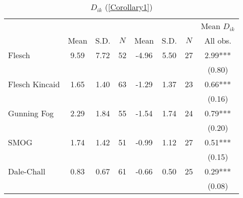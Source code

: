 \begin{table}
    \footnotesize
    \centering
    \begin{threeparttable}
        \caption{\(D_{ik}\) (\autoref{Corollary1})}
        \label{table8_base}
        \begin{tabular}{p{3cm}S[table-format=3.3]@{}S[table-format=3.3]@{}S[table-format=3.2]@{}S[table-format=4.3]@{}S[table-format=3.3]@{}S[table-format=3.1]@{}S@{}}
            \toprule
            &&&{{Mean \(D_{ik}\)}}\\\cmidrule(lr){2-4}\cmidrule(lr){5-7}\cmidrule(lr){8-8}&{{Mean}}&{{S.D.}}&{{\(N\)}}&{{Mean}}&{{S.D.}}&{{\(N\)}}&{{All obs.}}\\
            \midrule
            Flesch                        &        9.59&        7.72&          52&       -4.96&        5.50&          27&        2.99***\\
                                          &            &            &            &            &            &            &      (0.80)   \\
            Flesch Kincaid                &        1.65&        1.40&          63&       -1.29&        1.37&          23&        0.66***\\
                                          &            &            &            &            &            &            &      (0.16)   \\
            Gunning Fog                   &        2.29&        1.84&          55&       -1.54&        1.74&          24&        0.79***\\
                                          &            &            &            &            &            &            &      (0.20)   \\
            SMOG                          &        1.74&        1.42&          51&       -0.99&        1.12&          27&        0.51***\\
                                          &            &            &            &            &            &            &      (0.15)   \\
            Dale-Chall                    &        0.83&        0.67&          61&       -0.66&        0.50&          25&        0.29***\\
                                          &            &            &            &            &            &            &      (0.08)   \\

\end{tabular}
\end{threeparttable}
\end{table}
